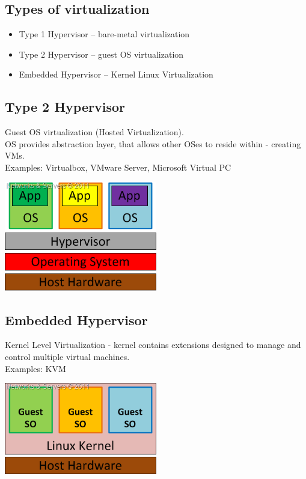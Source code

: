 \documentclass{beamer}
\begin{document}
\subsection{Types of virtualization}
\begin{frame}
\begin{itemize}
\item Type 1 Hypervisor -- bare-metal virtualization
\item Type 2 Hypervisor -- guest OS virtualization
\item Embedded Hypervisor -- Kernel Linux Virtualization
\end{itemize}
\end{frame}

\subsection{Type 2 Hypervisor}
\begin{frame}
Guest OS virtualization (Hosted Virtualization). \\
\pause
OS provides abstraction layer, that allows other OSes to reside within - creating VMs. \\
\pause
Examples: Virtualbox, VMware Server, Microsoft Virtual PC
\pause
\begin{center}
\includegraphics[width=0.5\textwidth]{images/type_2.png}
\end{center}
\end{frame}

\subsection{Embedded Hypervisor}
\begin{frame}
Kernel Level Virtualization - kernel contains extensions designed to manage and control multiple virtual machines. \\
\pause
Examples: KVM
\pause
\begin{center}
\includegraphics[width=0.5\textwidth]{images/kernel.png}
\end{center}
\end{frame}
\end{document}
